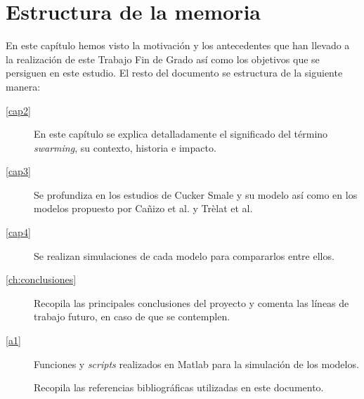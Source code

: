 \section{Estructura de la memoria}\label{s1_4}
En este capítulo hemos visto la motivación y los antecedentes que han llevado a la realización de este Trabajo Fin de Grado así como los objetivos que se persiguen en este estudio. El resto del documento se estructura de la siguiente manera:

\begin{description}
    \item[\autoref{cap2}] En este capítulo se explica detalladamente el significado del término \textit{swarming}, su contexto, historia e impacto.
    \item[\autoref{cap3}] Se profundiza en los estudios de Cucker Smale y su modelo así como en los modelos propuesto por Cañizo et al. y Trèlat et al.
    \item[\autoref{cap4}] Se realizan simulaciones de cada modelo para compararlos entre ellos. 
    \item[\autoref{ch:conclusiones}] Recopila las principales conclusiones del proyecto y comenta las líneas de trabajo futuro, en caso de que se contemplen.
    \item[\autoref{a1}] Funciones y \textit{scripts} realizados en Matlab para la simulación de los modelos.
    \item[] Recopila las referencias bibliográficas utilizadas en este documento.
\end{description}

